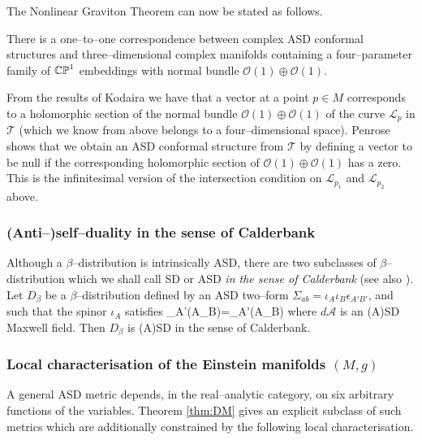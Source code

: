 The Nonlinear Graviton Theorem can now be stated as follows.
\begin{theo}
There is a one--to--one correspondence between complex ASD conformal structures and three--dimensional complex manifolds containing a four--parameter family of $\mathbb{CP}^1$ embeddings with normal bundle $\mathcal{O}(1)\oplus\mathcal{O}(1)$.
\end{theo}
\noindent
From the results of Kodaira \cite{Kodaira} we have that a vector at a point $p\in M$ corresponds to a holomorphic section of the normal bundle $\mathcal{O}(1)\oplus\mathcal{O}(1)$ of the curve $\mathscr{L}_p$ in $\mathscr{T}$ (which we know from above belongs to a four--dimensional space). Penrose shows that we obtain an ASD conformal structure from $\mathscr{T}$ by defining a vector to be null if the corresponding holomorphic section of $\mathcal{O}(1)\oplus\mathcal{O}(1)$ has a zero. This is the infinitesimal version of the intersection condition on $\mathscr{L}_{p_1}$ and $\mathscr{L}_{p_2}$ above. %


\subsubsection{(Anti--)self--duality in the sense of Calderbank}
Although a $\beta$--distribution is intrinsically ASD, there are two subclasses of $\beta$--distribution which we shall call SD or ASD \textit{in the sense of Calderbank} \cite{Cal1} (see also \cite{West}). Let $D_\beta$ be a $\beta$--distribution defined by an ASD two--form $\Sigma_{ab}=\iota_A\iota_B\epsilon_{A'B'}$, and  such that the spinor $\iota_A$ satisfies
\be
\label{dm3}
\nabla_{A'(A}\iota_{B)}=_{A'(A}\iota_{B)}
\ee
where $d\mathcal{A}$ is an (A)SD Maxwell field. Then $D_\beta$ is (A)SD in the sense of Calderbank.

 
\subsubsection{Local characterisation of the Einstein manifolds $(M,g)$}

A general ASD metric depends, in the real--analytic category, on six arbitrary functions of the variables. Theorem \ref{thm:DM} gives an explicit subclass of such metrics which are additionally constrained by the following local characterisation.

